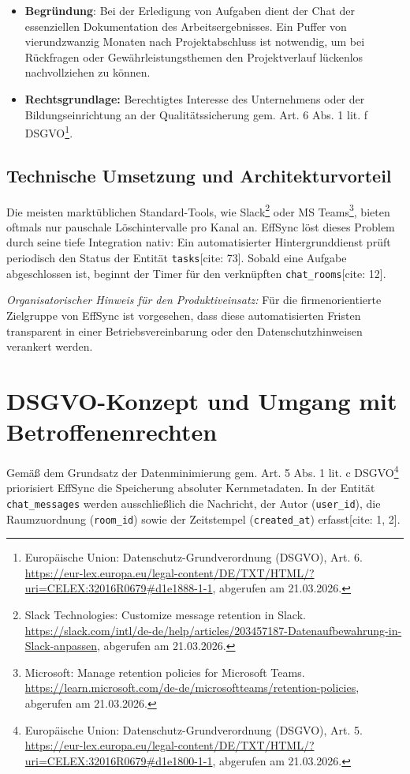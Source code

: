 \begin{itemize}
    \item \textbf{Begründung}: Bei der Erledigung von Aufgaben dient der Chat der essenziellen Dokumentation des Arbeitsergebnisses. Ein Puffer von vierundzwanzig Monaten nach Projektabschluss ist notwendig, um bei Rückfragen oder Gewährleistungsthemen den Projektverlauf lückenlos nachvollziehen zu können.
    \item \textbf{Rechtsgrundlage:} Berechtigtes Interesse des Unternehmens oder der Bildungseinrichtung an der Qualitätssicherung gem. Art. 6 Abs. 1 lit. f DSGVO\footnote{Europäische Union: Datenschutz-Grundverordnung (DSGVO), Art. 6. \url{https://eur-lex.europa.eu/legal-content/DE/TXT/HTML/?uri=CELEX:32016R0679\#d1e1888-1-1}, abgerufen am 21.03.2026.}.
\end{itemize}

\subsection{Technische Umsetzung und Architekturvorteil}
Die meisten marktüblichen Standard-Tools, wie Slack\footnote{Slack Technologies: Customize message retention in Slack. \url{https://slack.com/intl/de-de/help/articles/203457187-Datenaufbewahrung-in-Slack-anpassen}, abgerufen am 21.03.2026.} oder MS Teams\footnote{Microsoft: Manage retention policies for Microsoft Teams. \url{https://learn.microsoft.com/de-de/microsoftteams/retention-policies}, abgerufen am 21.03.2026.}, bieten oftmals nur pauschale Löschintervalle pro Kanal an. EffSync löst dieses Problem durch seine tiefe Integration nativ: Ein automatisierter Hintergrunddienst prüft periodisch den Status der Entität \texttt{tasks}[cite: 73]. Sobald eine Aufgabe abgeschlossen ist, beginnt der Timer für den verknüpften \texttt{chat\_rooms}[cite: 12].

\textit{Organisatorischer Hinweis für den Produktiveinsatz:} Für die firmenorientierte Zielgruppe von EffSync ist vorgesehen, dass diese automatisierten Fristen transparent in einer Betriebsvereinbarung oder den Datenschutzhinweisen verankert werden.

\section{DSGVO-Konzept und Umgang mit Betroffenenrechten}

Gemäß dem Grundsatz der Datenminimierung gem. Art. 5 Abs. 1 lit. c DSGVO\footnote{Europäische Union: Datenschutz-Grundverordnung (DSGVO), Art. 5. \url{https://eur-lex.europa.eu/legal-content/DE/TXT/HTML/?uri=CELEX:32016R0679\#d1e1800-1-1}, abgerufen am 21.03.2026.} priorisiert EffSync die Speicherung absoluter Kernmetadaten. In der Entität \texttt{chat\_messages} werden ausschließlich die Nachricht, der Autor (\texttt{user\_id}), die Raumzuordnung (\texttt{room\_id}) sowie der Zeitstempel (\texttt{created\_at}) erfasst[cite: 1, 2].

